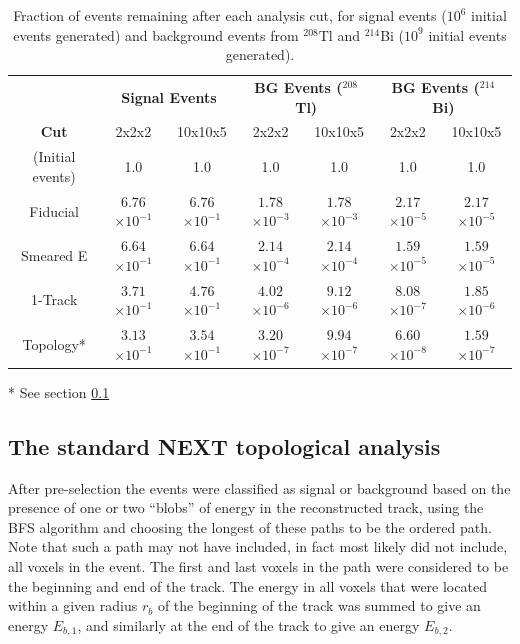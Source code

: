 \documentclass[a4paper,11pt]{article}
\begin{document}
\begin{table}[!htb]
	\begin{center}
		\caption[Fast analysis summary]{\label{tbl.FastAnalysisResults}Fraction of events remaining after each analysis cut, for signal events ($10^6$ initial events generated) and background events from $^{208}$Tl and $^{214}$Bi ($10^9$ initial events generated).}
		\begin{tabular}{c|cc|cc|cc}
			\\
			 & \multicolumn{2}{c}{\textbf{Signal Events}} & \multicolumn{2}{c}{\textbf{BG Events ($^{208}$Tl)}} & \multicolumn{2}{c}{\textbf{BG Events ($^{214}$Bi)}}\\
			\textbf{Cut} & 2x2x2 & 10x10x5 & 2x2x2 & 10x10x5 & 2x2x2 & 10x10x5\\
			\hline
			(Initial events) & 1.0 & 1.0 & 1.0 & 1.0 & 1.0 & 1.0\\
			Fiducial & $6.76$\small{$\times 10^{-1}$} & $6.76$\small{$\times 10^{-1}$} & $1.78$\small{$\times 10^{-3}$} & $1.78$\small{$\times 10^{-3}$} & $2.17$\small{$\times 10^{-5}$} & $2.17$\small{$\times 10^{-5}$}\\
			Smeared E & $6.64$\small{$\times 10^{-1}$} & $6.64$\small{$\times 10^{-1}$} & $2.14$\small{$\times 10^{-4}$} & $2.14$\small{$\times 10^{-4}$} & $1.59$\small{$\times 10^{-5}$} & $1.59$\small{$\times 10^{-5}$}\\
			1-Track & $3.71$\small{$\times 10^{-1}$} & $4.76$\small{$\times 10^{-1}$} & $4.02$\small{$\times 10^{-6}$} & $9.12$\small{$\times 10^{-6}$} & $8.08$\small{$\times 10^{-7}$} & $1.85$\small{$\times 10^{-6}$}\\
			Topology* & $3.13$\small{$\times 10^{-1}$} & $3.54$\small{$\times 10^{-1}$} & $3.20$\small{$\times 10^{-7}$} & $9.94$\small{$\times 10^{-7}$} & $6.60$\small{$\times 10^{-8}$} & $1.59$\small{$\times 10^{-7}$}\\
		\end{tabular}
	\end{center}
	* See section \ref{ssec:TopologicalAnalysis}
\end{table}

\subsection{The standard NEXT topological analysis}
\label{ssec:TopologicalAnalysis}
After pre-selection the events were classified as signal or background based on the presence of one or two ``blobs'' of energy in the
reconstructed track, using the BFS algorithm and choosing the longest of these paths to be the ordered path.  Note that such a path may not have included, 
in fact most likely did not include, all voxels in the event.  The first and last voxels in the path
were considered to be the beginning and end of the track.  The energy in all voxels that were located within a given radius $r_b$ of the beginning of the track was summed to give
an energy $E_{b,1}$, and similarly at the end of the track to give an energy $E_{b,2}$.  
\end{document}
